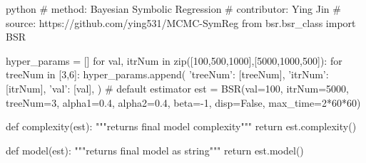 \begin{mintedbox}{python}
# method: Bayesian Symbolic Regression
# contributor: Ying Jin
# source: https://github.com/ying531/MCMC-SymReg
from bsr.bsr_class import BSR

hyper_params = []
for val, itrNum in zip([100,500,1000],[5000,1000,500]):
    for treeNum in [3,6]:
        hyper_params.append(
                    {'treeNum': [treeNum], 
                     'itrNum': [itrNum], 
                     'val': [val],
                    })
# default estimator
est = BSR(val=100, itrNum=5000, treeNum=3, alpha1=0.4, alpha2=0.4, 
          beta=-1, disp=False, max_time=2*60*60)

def complexity(est):
"""returns final model complexity"""
    return est.complexity()

def model(est):
"""returns final model as string"""
    return est.model()
\end{mintedbox}

